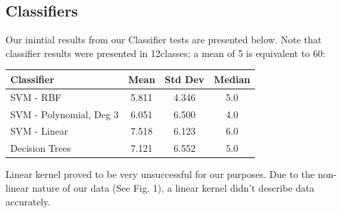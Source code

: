 \documentclass{article}
\begin{document}
\subsection{Classifiers}
Our inintial results from our Classifier tests are presented below. Note that classifier results were presented in 12\degrees classes; a mean of 5 is equivalent to 60\degrees: 

\begin{center}
\begin{tabular}{l|c|c|c}
Classifier & Mean & Std Dev & Median\\
\hline
SVM - RBF & 5.811 & 4.346 & 5.0 \\
SVM - Polynomial, Deg 3 & 6.051 & 6.500 & 4.0 \\
SVM - Linear & 7.518 & 6.123 & 6.0 \\
Decision Trees & 7.121 & 6.552 & 5.0
\end{tabular}
\end{center}

 Linear kernel proved to be very unsuccessful for our purposes. Due to the non-linear nature of our data (See Fig. 1), a linear kernel didn't describe data accurately.
\end{document}
